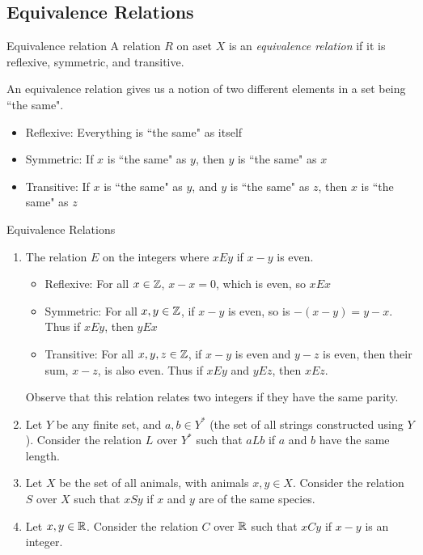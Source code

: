 \documentclass[class=article, crop=false]{standalone}
\begin{document}
  \subsection{Equivalence Relations}
  \begin{definition}{Equivalence relation}
    A relation $R$ on  aset $X$ is an \emph{equivalence relation} if it is reflexive, symmetric, and transitive.
  \end{definition}
  \begin{note}{}
    An equivalence relation gives us a notion of two different elements in a set being ``the same".
    \begin{itemize}
      \item Reflexive: Everything is ``the same" as itself
      \item Symmetric: If $x$ is ``the same" as $y$, then $y$ is ``the same" as $x$
      \item Transitive: If $x$ is ``the same" as $y$, and $y$ is ``the same" as $z$, then $x$ is ``the same" as $z$
    \end{itemize}
  \end{note}
  \begin{example}{Equivalence Relations}
    \begin{enumerate}[label=(\alph*)]
      \item The relation $E$ on the integers where $xEy$ if $x-y$ is even.
      \begin{itemize}
        \item Reflexive: For all $x\in\mathbb{Z}$, $x - x = 0$, which is even, so $xEx$
        \item Symmetric: For all $x, y\in\mathbb{Z}$, if $x - y$ is even, so is $-(x-y)=y-x$. Thus if $xEy$, then $yEx$
        \item Transitive: For all $x,y,z\in\mathbb{Z}$, if $x-y$ is even and $y-z$ is even, then their sum, $x-z$, is also even. Thus if $xEy$ and $yEz$, then $xEz$.
      \end{itemize}
      Observe that this relation relates two integers if they have the same parity.
      \item Let $Y$ be any finite set, and $a,b\in Y^*$ (the set of all strings constructed using $Y$). Consider the relation $L$ over $Y^*$ such that $aLb$ if $a$ and $b$ have the same length.
      \item Let $X$ be the set of all animals, with animals $x,y\in X$. Consider the relation $S$ over $X$ such that $xSy$ if $x$ and $y$ are of the same species.
      \item Let $x,y\in\mathbb{R}$. Consider the relation $C$ over $\mathbb{R}$ such that $xCy$ if $x-y$ is an integer.
    \end{enumerate}
  \end{example}
\end{document}
